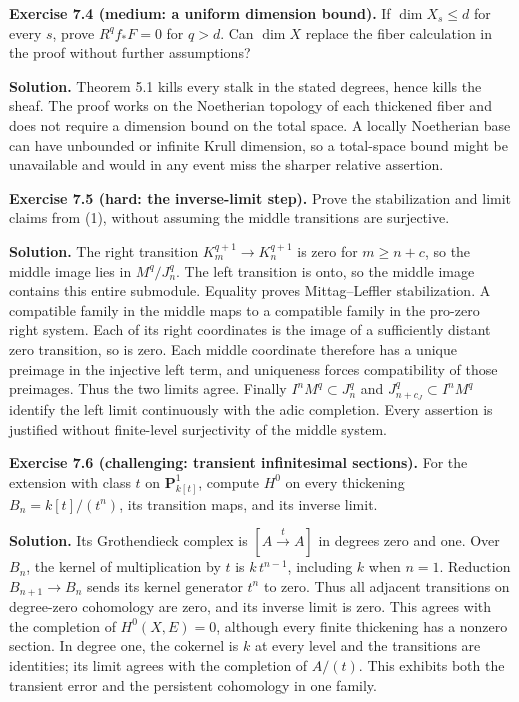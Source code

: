\documentclass[11pt]{article}
\begin{document}
\textbf{Exercise 7.4 (medium: a uniform dimension bound).} If
\(\dim X_s\leq d\) for every \(s\), prove \(R^qf_*F=0\) for \(q>d\). Can
\(\dim X\) replace the fiber calculation in the proof without further
assumptions?

\textbf{Solution.} Theorem 5.1 kills every stalk in the stated degrees,
hence kills the sheaf. The proof works on the Noetherian topology of
each thickened fiber and does not require a dimension bound on the total
space. A locally Noetherian base can have unbounded or infinite Krull
dimension, so a total-space bound might be unavailable and would in any
event miss the sharper relative assertion.

\textbf{Exercise 7.5 (hard: the inverse-limit step).} Prove the
stabilization and limit claims from (1), without assuming the middle
transitions are surjective.

\textbf{Solution.} The right transition \(K_m^{q+1}\to K_n^{q+1}\) is
zero for \(m\geq n+c\), so the middle image lies in \(M^q/J_n^q\). The
left transition is onto, so the middle image contains this entire
submodule. Equality proves Mittag--Leffler stabilization. A compatible
family in the middle maps to a compatible family in the pro-zero right
system. Each of its right coordinates is the image of a sufficiently
distant zero transition, so is zero. Each middle coordinate therefore
has a unique preimage in the injective left term, and uniqueness forces
compatibility of those preimages. Thus the two limits agree. Finally
\(I^nM^q\subset J_n^q\) and \(J_{n+c_J}^q\subset I^nM^q\) identify the
left limit continuously with the adic completion. Every assertion is
justified without finite-level surjectivity of the middle system.

\textbf{Exercise 7.6 (challenging: transient infinitesimal sections).}
For the extension with class \(t\) on \(\mathbf P^1_{k[t]}\), compute
\(H^0\) on every thickening \(B_n=k[t]/(t^n)\), its transition maps, and
its inverse limit.

\textbf{Solution.} Its Grothendieck complex is \([A\xrightarrow{t}A]\)
in degrees zero and one. Over \(B_n\), the kernel of multiplication by
\(t\) is \(k\,t^{n-1}\), including \(k\) when \(n=1\). Reduction
\(B_{n+1}\to B_n\) sends its kernel generator \(t^n\) to zero. Thus all
adjacent transitions on degree-zero cohomology are zero, and its inverse
limit is zero. This agrees with the completion of \(H^0(X,E)=0\),
although every finite thickening has a nonzero section. In degree one,
the cokernel is \(k\) at every level and the transitions are identities;
its limit agrees with the completion of \(A/(t)\). This exhibits both
the transient error and the persistent cohomology in one family.
\end{document}
